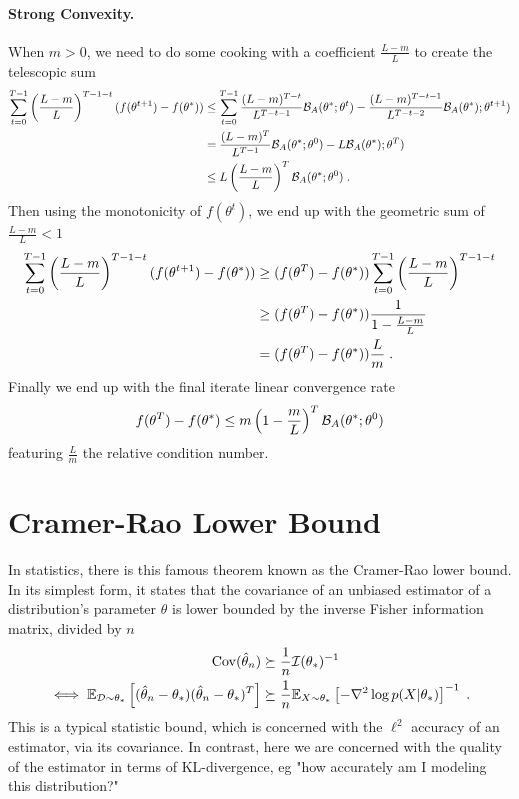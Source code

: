 \documentclass{article}
\newcommand*{\expect}[2][]{\ensuremath{\mathbb{E}_{#1} \left[ #2 \right] }} %
\newcommand{\logpart}{A}
\newcommand{\bregman}{\cB_\logpart}
\newcommand{\nat}{\theta}
\begin{document}
\paragraph{Strong Convexity.} 
When $m>0$, we need to do some cooking with a coefficient $\frac{L-m}{L}$ to create the telescopic sum
\begin{align}
	\sum_{t=0}^{T-1} \left( \frac{L-m}{L} \right)^{T-1-t} (f(\nat^{t+1}) - f(\nat^*)) 
	&\leq \sum_{t=0}^{T-1} \frac{( L-m)^{T-t}}{L^{T-t -1}} \bregman(\nat^{*}; \nat^{t}) 
	- \frac{( L-m)^{T-t-1}}{L^{T-t-2}} \bregman(\nat^{*}); \nat^{t+1}) \\
	&= \frac{( L-m)^{T}}{L^{T-1}}  \bregman(\nat^{*}; \nat^{0}) 
	- L \bregman(\nat^{*}); \nat^{T}) \\
	&\leq L \left( \frac{L-m}{L} \right)^T \bregman(\nat^{*}; \nat^{0}) \; .
\end{align}
Then using the monotonicity of $f(\nat^t)$, we end up with the geometric sum of $\frac{L-m}{L} < 1$
\begin{align}
		\sum_{t=0}^{T-1} \left( \frac{L-m}{L} \right)^{T-1-t} (f(\nat^{t+1}) - f(\nat^*)) 
		&\geq (f(\nat^{T}) - f(\nat^*)) \sum_{t=0}^{T-1} \left( \frac{L-m}{L} \right)^{T-1-t} \\
		&\geq (f(\nat^{T}) - f(\nat^*)) \inv{1 - \frac{L-m}{L}} \\
		&= (f(\nat^{T}) - f(\nat^*)) \frac{L}{m} \; .
\end{align}
Finally we end up with the final iterate linear convergence rate
\begin{align}
	f(\nat^{T}) - f(\nat^*)
	\leq m  \left( 1 - \frac{m}{L} \right)^T \bregman(\nat^{*}; \nat^{0}) 
\end{align}
featuring $\frac{L}{m} $ the relative condition number.

\section{Cramer-Rao Lower Bound}
In statistics, there is this famous theorem known as the Cramer-Rao lower bound. In its simplest form, it states that the covariance of an unbiased estimator of a distribution's parameter $\nat$ is lower bounded by the inverse Fisher information matrix, divided by $n$
\begin{align}
    \Cov(\hat \nat_n)  
    &\succeq \inv{n} \cI(\nat_*)^{-1} \\
    \iff
    \expect[\cD\sim \nat_*]{(\hat \nat_n - \nat_*)(\hat \nat_n - \nat_*)^T}
    &\succeq \inv{n} \expect[X\sim \nat_*]{-\nabla^2 \log p(X|\nat_*)}^{-1} \; .
\end{align}
This is a typical statistic bound, which is concerned with the $\ell^2$ accuracy of an estimator, via its covariance. In contrast, here we are concerned with the quality of the estimator in terms of KL-divergence, eg "how accurately am I modeling this distribution?"
\end{document}
